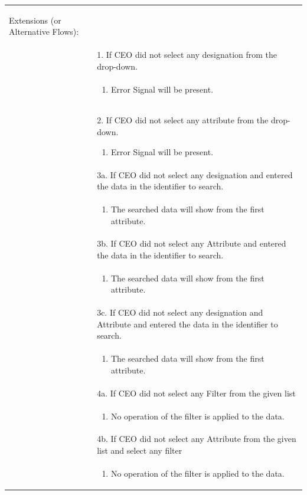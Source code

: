 \documentclass[12pt,a4paper]{article}
\begin{document}
\begin{longtable}{| p{3cm}|p{12cm}|}
\begin{enumerate}
\end{enumerate}

Extensions (or Alternative Flows):\\

& 1. If CEO did not select any designation from the drop-down. \\
& \begin{enumerate}
		\item Error Signal will be present.
	\end{enumerate}
\\ 

      & 2. If CEO did not select any attribute from the drop-down.
 	\begin{enumerate}
		\item Error Signal will be present.
	\end{enumerate}
\\ 
& 3a. If CEO did not select any designation and entered the data in the identifier to search. \\
& \begin{enumerate}
		\item The searched data will show from the first attribute.
	\end{enumerate}
\\
& 3b. If CEO did not select any Attribute and entered the data in the identifier to search. \\
& \begin{enumerate}
		\item The searched data will show from the first attribute.
	\end{enumerate}
\\ 
& 3c. If CEO did not select any designation and  Attribute and entered the data in the identifier to search. \\
& \begin{enumerate}
		\item The searched data will show from the first attribute.
	\end{enumerate}
\\ 

& 4a. If CEO did not select any Filter from the given list \\
& \begin{enumerate}
		\item No operation of the filter is applied to the data.
	\end{enumerate}
\\ 
& 4b. If CEO did not select any Attribute from the given list and select any filter  \\
& \begin{enumerate}
		\item No operation of the filter is applied to the data.
	\end{enumerate}
\\ 


\end{longtable}
\end{document}
